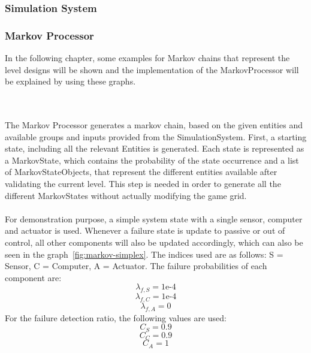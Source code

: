 \subsubsection{Simulation System}\label{subsubsec:simulation-system}

\subsubsection{Markov Processor}\label{subsubsec:example-markov-chains}
In the following chapter, some examples for Markov chains that represent the level designs will be shown and the implementation of the
MarkovProcessor will be explained by using these graphs.

\\ \\

The Markov Processor generates a markov chain, based on the given entities and available groups and inputs provided from the SimulationSystem.
First, a starting state, including all the relevant Entities is generated.
Each state is represented as a MarkovState, which contains the probability of the state occurrence and a list of MarkovStateObjects, that represent the different entities available after validating
the current level.
This step is needed in order to generate all the different MarkovStates without actually modifying the game grid.
\\ \\
For demonstration purpose, a simple system state with a single sensor, computer and actuator is used.
Whenever a failure state is update to passive or out of control, all other components will also be updated accordingly, which can also be seen in the graph~\ref{fig:markov-simplex}.
The indices used are as follows: S = Sensor, C = Computer, A = Actuator.
The failure probabilities of each component are:
\begin{equation}
    \lambda_{f,S} = 1\text{e-}4
    \label{eq:markov-1}
\end{equation}
\begin{equation}
    \lambda_{f,C} = 1\text{e-}4
    \label{eq:markov-2}
\end{equation}
\begin{equation}
    \lambda_{f,A} = 0
    \label{eq:markov-3}
\end{equation}
For the failure detection ratio, the following values are used:
\begin{equation}
    C_{S} = 0.9
    \label{eq:markov-4}
\end{equation}
\begin{equation}
    C_{C} = 0.9
    \label{eq:markov-5}
\end{equation}
\begin{equation}
    C_{A} = 1
    \label{eq:markov-6}
\end{equation}

